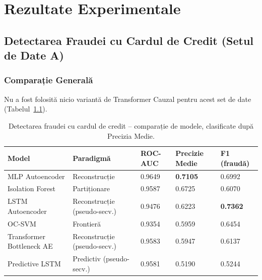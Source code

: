 \chapter{Rezultate Experimentale}
\label{ch:results}


\section{Detectarea Fraudei cu Cardul de Credit (Setul de Date A)}

\subsection{Comparație Generală}

Nu a fost folosită nicio variantă de Transformer Cauzal pentru acest set de date (Tabelul~\ref{tab:cc-results}).

\begin{table}[h]
\centering
\footnotesize
\begin{tabular}{@{}lllll@{}}
\toprule
Model & Paradigmă & ROC-AUC & Precizie Medie & F1 (fraudă) \\
\midrule
MLP Autoencoder            & Reconstrucție              & 0.9649 & \textbf{0.7105} & 0.6992 \\
Isolation Forest           & Partiționare                   & 0.9587 & 0.6725          & 0.6070 \\
LSTM Autoencoder           & Reconstrucție (pseudo-secv.) & 0.9476 & 0.6223          & \textbf{0.7362} \\
OC-SVM                     & Frontieră                     & 0.9354 & 0.5959          & 0.6454 \\
Transformer Bottleneck AE  & Reconstrucție (pseudo-secv.) & 0.9583 & 0.5947          & 0.6137 \\
Predictive LSTM            & Predictiv (pseudo-secv.)     & 0.9581 & 0.5190          & 0.5244 \\
\bottomrule
\end{tabular}
\caption{Detectarea fraudei cu cardul de credit -- comparație de modele, clasificate după Precizia Medie.}
\label{tab:cc-results}
\end{table}

